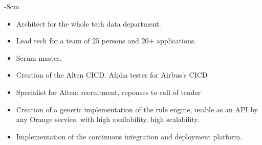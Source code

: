 \documentclass[10pt,a4paper]{altacv}
\begin{document}

\begin{adjustwidth}{}{-8cm}
\makecvheader
\end{adjustwidth}

\begin{itemize}
\item Architect for the whole tech data department.
\item Lead tech for a team of 25 persons and 20+ applications.
\item Scrum master.
\item Creation of the Alten CICD. Alpha tester for Airbus's CICD
\item Specialist for Alten: recruitment, reponses to call of tender
\end{itemize}
\divider

\begin{itemize}
\item Creation of a generic implementation of the rule engine, usable as an API by any Orange service, with high availability, high scalability.
\item Implementation of the continuous integration and deployment platform.
\end{itemize}
\end{document}
